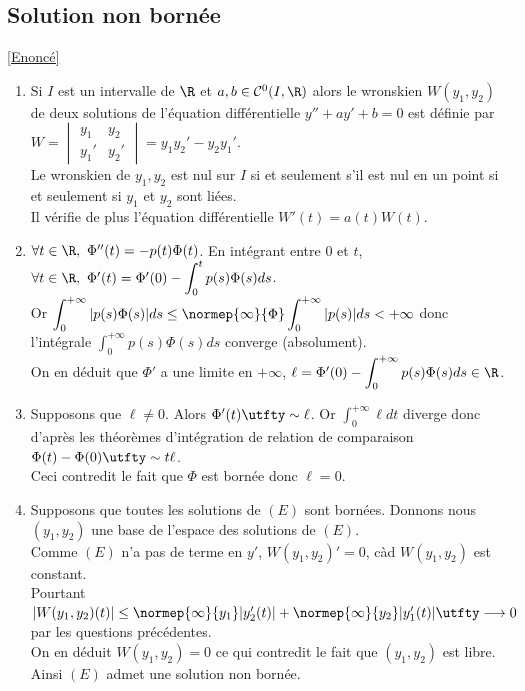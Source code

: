 \documentclass{book}
\begin{document}
	\subsection{Solution non bornée }
	\label{Solution non bornée corrigé}
	\textcolor{blue}{\hyperref[Solution non bornée]{[Enoncé]}}\\
	\begin{enumerate}[leftmargin=*]
		\item Si $I$ est un intervalle de $\R$ et $a,b\in \mathcal C^0(I,\R)$ alors le wronskien $W(y_1,y_2)$ de deux solutions de l'équation différentielle $y''+ay'+b=0$ est définie par $W=\begin{vmatrix}y_1&y_2\\y_1'&y_2'\end{vmatrix}=y_1y_2'-y_2y_1'$.\\
		Le wronskien de $y_1,y_2$ est nul sur $I$ si et seulement s'il est nul en un point si et seulement si $y_1$ et $y_2$ sont liées.\\
		Il vérifie de plus l'équation différentielle $W'(t)=a(t)W(t)$.
		\item $\forall t\in \R,\ \Phi''(t)=-p(t)\Phi(t)$. En intégrant entre $0$ et $t$, $\forall t\in \R,\ \Phi'(t)=\Phi'(0)-\displaystyle\int_0^tp(s)\Phi(s)ds$.\\
		Or $\displaystyle\int_0^{+\infty}|p(s)\Phi(s)|ds\leq \normep{\infty}{\Phi}\int_0^{+\infty}|p(s)|ds<+\infty$ donc l'intégrale $\displaystyle\int_0^{+\infty}p(s)\Phi(s)ds$ converge (absolument).\\
		On en déduit que $\Phi'$ a une limite en $+\infty$, $\ell=\Phi'(0)-\displaystyle\int_0^{+\infty}p(s)\Phi(s)ds\in \R$.
		\item Supposons que $\ell\ne 0$. Alors $\Phi'(t)\utfty\sim\ell$. Or $\displaystyle\int_0^{+\infty}\ell dt$ diverge donc d'après les théorèmes d'intégration de relation de comparaison $\Phi(t)-\Phi(0)\utfty\sim t\ell$.\\
		Ceci contredit le fait que $\Phi$ est bornée donc $\ell=0$.
		\item Supposons que toutes les solutions de $(E)$ sont bornées. Donnons nous $(y_1,y_2)$ une base de l'espace des solutions de $(E)$.\\
		Comme $(E)$ n'a pas de terme en $y'$, $W(y_1,y_2)'=0$, càd $W(y_1,y_2)$ est constant.\\
		Pourtant $|W(y_1,y_2)(t)|\leq \normep{\infty}{y_1}|y_2'(t)|+\normep{\infty}{y_2}|y_1'(t)|\utfty\longrightarrow 0$ par les questions précédentes.\\
		On en déduit $W(y_1,y_2)=0$ ce qui contredit le fait que $(y_1,y_2)$ est libre. Ainsi $(E)$ admet une solution non bornée.
	\end{enumerate}
	
\end{document}
